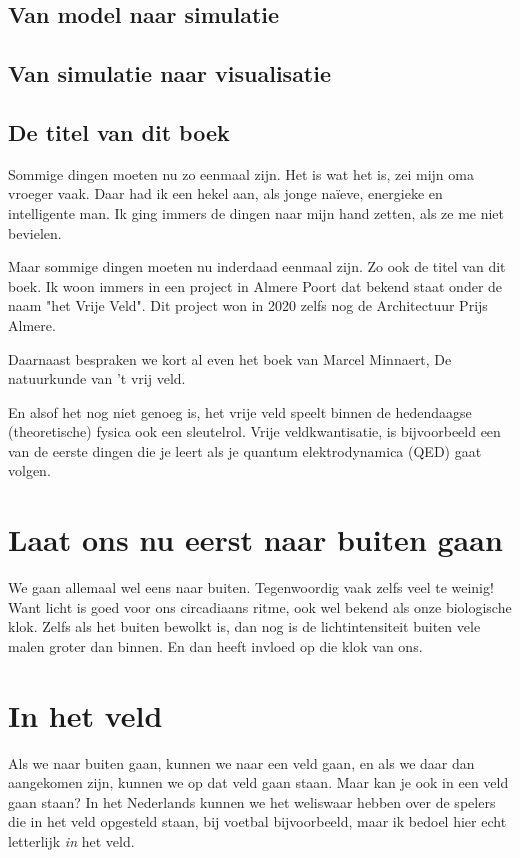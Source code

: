 \documentclass{article}      %
\begin{document}
\subsection{Van model naar simulatie}

\subsection{Van simulatie naar visualisatie}


\subsection{De titel van dit boek}

Sommige dingen moeten nu zo eenmaal zijn. Het is wat het is, zei mijn oma 
vroeger vaak. Daar had ik een hekel aan, als jonge naïeve, energieke en
intelligente man. Ik ging immers de dingen naar mijn hand zetten, als ze 
me niet bevielen.

Maar sommige dingen moeten nu inderdaad eenmaal zijn. Zo ook de titel van 
dit boek. Ik woon immers in een project in Almere Poort dat bekend staat
onder de naam "het Vrije Veld". Dit project won in 2020 zelfs nog de 
Architectuur Prijs Almere.

Daarnaast bespraken we kort al even het boek van Marcel Minnaert,
De natuurkunde van 't vrij veld.

En alsof het nog niet genoeg is, het vrije veld speelt binnen de 
hedendaagse (theoretische) fysica ook een sleutelrol. Vrije veldkwantisatie, 
is bijvoorbeeld een van de eerste dingen die je leert als je quantum 
elektrodynamica (QED) gaat volgen.

\section{Laat ons nu eerst naar buiten gaan}

We gaan allemaal wel eens naar buiten. Tegenwoordig vaak zelfs veel te weinig!
Want licht is goed voor ons circadiaans ritme, ook wel bekend als onze 
biologische klok. Zelfs als het buiten bewolkt is, dan nog is de lichtintensiteit  
buiten vele malen groter dan binnen. En dan heeft invloed op die klok van ons.

\section{In het veld}

Als we naar buiten gaan, kunnen we naar een veld gaan, en als we daar 
dan aangekomen zijn, kunnen we op dat
veld gaan staan. Maar kan je ook in een veld gaan staan? In het 
Nederlands kunnen we het weliswaar hebben over de spelers die in 
het veld opgesteld staan, bij voetbal bijvoorbeeld, maar ik bedoel hier 
echt letterlijk {\it in}  het veld.
\end{document}

